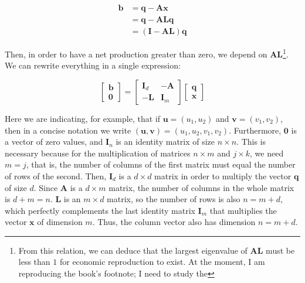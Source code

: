 \begin{align}
\boldsymbol{b} & =\boldsymbol{q}-\boldsymbol{A}\boldsymbol{x}\\
 & =\boldsymbol{q}-\boldsymbol{A}\boldsymbol{L}\boldsymbol{q}\\
 & =\left(\boldsymbol{I}-\boldsymbol{A}\boldsymbol{L}\right)\boldsymbol{q}
\end{align}

Then, in order to have a net production greater than zero, we depend on $\boldsymbol{AL}$\footnote{From this relation, we can deduce that the largest eigenvalue of $\boldsymbol{AL}$ must be less than $1$ for economic reproduction to exist. At the moment, I am reproducing the book's footnote; I need to study the}. We can rewrite everything in a single expression:

\begin{equation}
\left[\begin{array}{c}
\boldsymbol{b}\\
\boldsymbol{0}
\end{array}\right]=\left[\begin{array}{cc}
\boldsymbol{I}_{d} & -\boldsymbol{A}\\
-\boldsymbol{L} & \boldsymbol{I}_{m}
\end{array}\right]\left[\begin{array}{c}
\boldsymbol{q}\\
\boldsymbol{x}
\end{array}\right]
\end{equation}

Here we are indicating, for example, that if $\boldsymbol{u}=\left(u_{1},u_{2}\right)$ and $\boldsymbol{v}=\left(v_{1},v_{2}\right)$, then in a concise notation we write $\left(\boldsymbol{u},\boldsymbol{v}\right)=\left(u_{1},u_{2},v_{1},v_{2}\right)$. Furthermore, $\boldsymbol{0}$ is a vector of zero values, and $\boldsymbol{I}_{n}$ is an identity matrix of size $n\times n$. This is necessary because for the multiplication of matrices $n\times m$ and $j\times k$, we need $m=j$, that is, the number of columns of the first matrix must equal the number of rows of the second. Then, $\boldsymbol{I}_{d}$ is a $d\times d$ matrix in order to multiply the vector $\boldsymbol{q}$ of size $d$. Since $\boldsymbol{A}$ is a $d\times m$ matrix, the number of columns in the whole matrix is $d+m=n$. $\boldsymbol{L}$ is an $m\times d$ matrix, so the number of rows is also $n=m+d$, which perfectly complements the last identity matrix $\boldsymbol{I}_{m}$ that multiplies the vector $\boldsymbol{x}$ of dimension $m$. Thus, the column vector also has dimension $n=m+d$.

